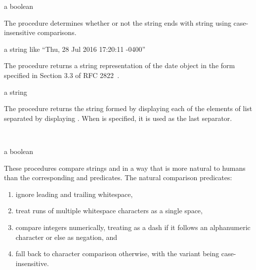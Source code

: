 \begin{procedure}
\end{procedure}
\returns{} a boolean

The  procedure determines whether or not the
string  ends with string  using case-insensitive
comparisons.

\begin{procedure}
\end{procedure}
\returns{} a string like ``Thu, 28 Jul 2016 17:20:11 -0400''

The  procedure returns a string representation of
the date object  in the form specified in Section 3.3 of RFC
2822~\cite{RFC2822}.

\begin{procedure}
\end{procedure}
\returns{} a string

The  procedure returns the string formed by displaying each
of the elements of list  separated by displaying
. When  is specified, it is used as
the last separator.

\begin{procedure}
  \\
  \strut
\end{procedure}
\returns{} a boolean

These procedures compare strings  and  in a way that is
more natural to humans than the corresponding
 and  predicates.
The natural comparison predicates:
\begin{enumerate}
 \item ignore leading and trailing whitespace,
 \item treat runs of multiple whitespace characters as a single space,
 \item compare integers numerically, treating \code{-} as a dash
   if it follows an alphanumeric character or else as negation, and
 \item fall back to character comparison otherwise, with the 
   variant being case-insensitive.
\end{enumerate}

